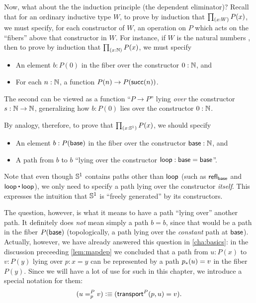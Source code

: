 %
%
Now, what about the the induction principle (the dependent eliminator)?
Recall that for an ordinary inductive type $W$, to prove by induction that $\prd{x:W} P(x)$, we must specify, for each constructor of $W$, an operation on $P$ which acts on the ``fibers'' above that constructor in $W$.
For instance, if $W$ is the natural numbers \nat, then to prove by induction that $\prd{x:\nat} P(x)$, we must specify
\begin{itemize}
\item An element $b:P(0)$ in the fiber over the constructor $0:\mathbb{N}$, and
\item For each $n:\mathbb{N}$, a function $P(n) \to P(\mathsf{succ}(n))$.
\end{itemize}
The second can be viewed as a function ``$P\to P$'' lying \emph{over} the constructor $s:\mathbb{N}\to\mathbb{N}$, generalizing how $b:P(0)$ lies over the constructor $0:\mathbb{N}$.

By analogy, therefore, to prove that $\prd{x:\Sn^1} P(x)$, we should specify
\begin{itemize}
\item An element $b:P(\mathsf{base})$ in the fiber over the constructor $\mathsf{base}:\mathbb{N}$, and
\item A path from $b$ to $b$ ``lying over the constructor $\mathsf{loop}:\mathsf{base}=\mathsf{base}$''.
\end{itemize}
Note that even though $\mathbb{S}^1$ contains paths other than $\mathsf{loop}$ (such as $\mathsf{refl}_{\mathsf{base}}$ and $\lloop\ct\lloop$), we only need to specify a path lying over the constructor \emph{itself}.
This expresses the intuition that $\mathbb{S}^1$ is ``freely generated'' by its constructors.

The question, however, is what it means to have a path ``lying over'' another path.
It definitely does \emph{not} mean simply a path $b=b$, since that would be a path in the fiber $P(\mathsf{base})$ (topologically, a path lying over the \emph{constant} path at $\mathsf{base}$).
Actually, however, we have already answered this question in \autoref{cha:basics}: in the discussion preceeding \autoref{lem:mapdep} we concluded that a path from $u:P(x)$ to $v:P(y)$ lying over $p:x=y$ can be represented by a path ${p}_{*}\mathopen{}\left({u}\right)\mathclose{} = v$ in the fiber $P(y)$.
Since we will have a lot of use for such 
%
in this chapter, we introduce a special notation for them:
\begin{equation}
  (\dpath P p u v) \defeq (\transfib{P} p u = v).\label{eq:dpath}
\end{equation}

